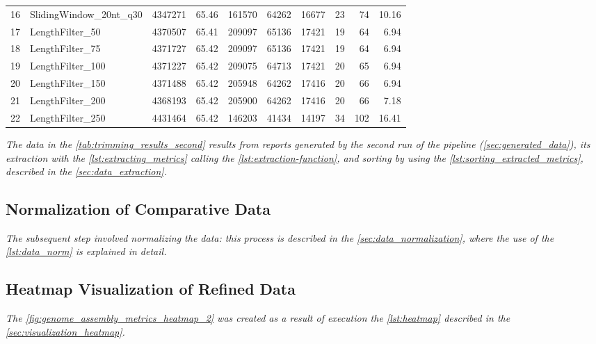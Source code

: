 \begin{table}[ht!]
{\begin{tabular}{|c|l|r|r|r|r|r|r|r|r|}
16 & SlidingWindow\_20nt\_q30 & 4347271 & 65.46 & 161570 & 64262 & 16677 & 23 & 74 & 10.16 \\
17 & LengthFilter\_50 & 4370507 & 65.41 & 209097 & 65136 & 17421 & 19 & 64 & 6.94 \\
18 & LengthFilter\_75 & 4371727 & 65.42 & 209097 & 65136 & 17421 & 19 & 64 & 6.94 \\
19 & LengthFilter\_100 & 4371227 & 65.42 & 209075 & 64713 & 17421 & 20 & 65 & 6.94 \\
20 & LengthFilter\_150 & 4371488 & 65.42 & 205948 & 64262 & 17416 & 20 & 66 & 6.94 \\
21 & LengthFilter\_200 & 4368193 & 65.42 & 205900 & 64262 & 17416 & 20 & 66 & 7.18 \\
22 & LengthFilter\_250 & 4431464 & 65.42 & 146203 & 41434 & 14197 & 34 & 102 & 16.41 \\
\hline
\end{tabular}%
}
\end{table}


\textit{The data in the \autoref{tab:trimming_results_second} results from reports generated by the second run of the pipeline (\autoref{sec:generated_data}), its extraction with the \autoref{lst:extracting_metrics} calling the \autoref{lst:extraction-function}, and sorting by using the \autoref{lst:sorting_extracted_metrics}, described in the  \autoref{sec:data_extraction}.}

\subsection{Normalization of Comparative Data}

\textit{The subsequent step involved normalizing the data: this process is described in the \autoref{sec:data_normalization}, where the use of the \autoref{lst:data_norm} is explained in detail.}

\subsection{Heatmap Visualization of Refined Data}

\textit{The \autoref{fig:genome_assembly_metrics_heatmap_2} was created as a result of execution the \autoref{lst:heatmap} described in the  \autoref{sec:visualization_heatmap}.}

